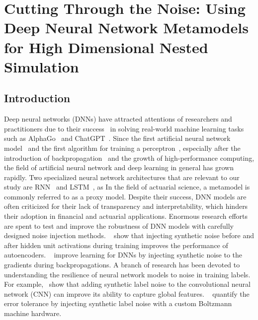 \chapter{Cutting Through the Noise: Using Deep Neural Network Metamodels for High Dimensional Nested Simulation}
\label{chap:project2}


\section{Introduction}

Deep neural networks (DNNs) have attracted attentions of researchers and practitioners due to their success~\citep{hastie2009elements,lecun2015deep} in solving real-world machine learning tasks such as AlphaGo~\citep{silver2016mastering} and ChatGPT~\citep{chatgpt}.
Since the first artificial neural network model~\citep{mcculloch1943logical} and the first algorithm for training a perceptron~\citep{rosenblatt1958perceptron}, especially after the introduction of backpropagation~\citep{rumelhart1985learning} and the growth of high-performance computing, the field of artificial neural network and deep learning in general has grown rapidly.
Two specialized neural network architectures that are relevant to our study are RNN~\citep{williams1989learning,sutskever2014sequence} and LSTM~\citep{hochreiter1997long,chung2014empirical}, as In the field of actuarial science, a metamodel is commonly referred to as a proxy model.
Despite their success, DNN models are often criticized for their lack of transparency and interpretability, which hinders their adoption in financial and actuarial applications.
Enormous research efforts are spent to test and improve the robustness of DNN models with carefully designed noise injection methods.
~\cite{poole2014analyzing} show that injecting synthetic noise before and after hidden unit activations during training improves the performance of autoencoders.
~\cite{neelakantan2015adding} improve learning for DNNs by injecting synthetic noise to the gradients during backpropagations.
A branch of research has been devoted to understanding the resilience of neural network models to noise in training labels.
For example,~\cite{luo2016understanding} show that adding synthetic label noise to the convolutional neural network (CNN) can improve its ability to capture global features. 
~\cite{srivastava2014dropout} quantify the error tolerance by injecting synthetic label noise with a custom Boltzmann machine hardware.
